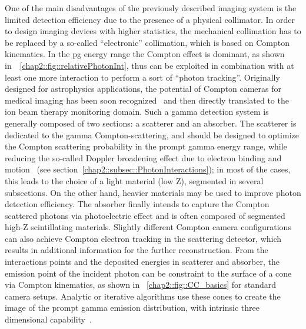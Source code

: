 One of the main disadvantages of the previously described imaging system is the limited detection efficiency due to the presence of a physical collimator. In order to design imaging devices with higher statistics, the mechanical collimation has to be replaced by a so-called \enquote{electronic} collimation, which is based on Compton kinematics. In the \gls{pg} energy range the Compton effect is dominant, as shown in~\figurename~\ref{chap2::fig::relativePhotonInt}, thus can be exploited in combination with at least one more interaction to perform a sort of \enquote{photon tracking}. 
Originally designed for astrophysics applications, the potential of Compton cameras for medical imaging has been soon recognized~\parencite{Todd1974, Singh1983} and then directly translated to the ion beam therapy monitoring domain. Such a gamma detection system is generally composed of two sections: a scatterer and an absorber. The scatterer is dedicated to the gamma Compton-scattering, and should be designed to optimize the Compton scattering probability in the prompt gamma energy range, while reducing the so-called Doppler broadening effect due to electron binding and motion~\parencite{Ordonez1997} (see section~\ref{chap2::subsec::PhotonInteractions}); in most of the cases, this leads to the choice of a light material (low Z), segmented in several subsections. On the other hand, heavier materials may be used to improve photon detection efficiency. The absorber finally intends to capture the Compton scattered photons via photoelectric effect and is often composed of segmented high-Z scintillating materials. Slightly different Compton camera configurations can also achieve Compton electron tracking in the scattering detector, which results in additional information for the further reconstruction.
From the interactions points and the deposited energies in scatterer and absorber, the emission point of the incident photon can be constraint to the surface of a cone via Compton kinematics, as shown in \figurename~\ref{chap2::fig::CC_basics} for standard camera setups. Analytic or iterative algorithms use these cones to create the image of the prompt gamma emission distribution, with intrinsic three dimensional capability~\parencite{McKisson1994, Kuchment2016}. 
  
